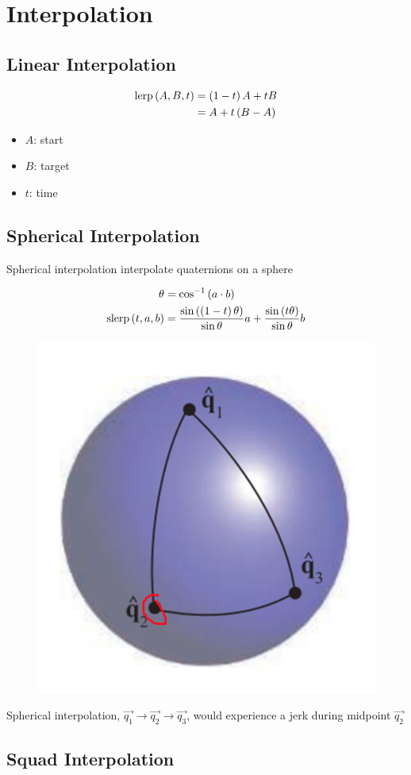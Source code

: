 \chapter{Interpolation}

\section{Linear Interpolation}

  \begin{align}
    \operatorname{lerp}\left( A, B, t \right)
    &= \left( 1 - t \right) A + tB \\
    &= A + t\left( B - A \right)
  \end{align}

  \begin{itemize}
    \item $ A $: start
    \item $ B $: target
    \item $ t $: time
  \end{itemize}

\section{Spherical Interpolation}

  Spherical interpolation interpolate quaternions on a sphere

  \begin{align}
    \theta &= \cos^{-1}\left( a \cdot b \right) \\
    \operatorname{slerp}\left( t, a, b \right) &=
      \frac{\sin\left( \left( 1 - t \right) \theta \right)}{\sin \theta} a
      + \frac{\sin\left( t \theta \right)}{\sin \theta} b
  \end{align}

  \begin{figure}[H]
    \centering
    \includegraphics[width=0.2\columnwidth]{images/interpolation/slerp-jerk.png}
  \end{figure}

  Spherical interpolation, $ \vec{q_{1}} \to \vec{q_{2}} \to \vec{q_{3}} $,
  would experience a jerk during midpoint $ \vec{q_{2}} $

\section{Squad Interpolation}


